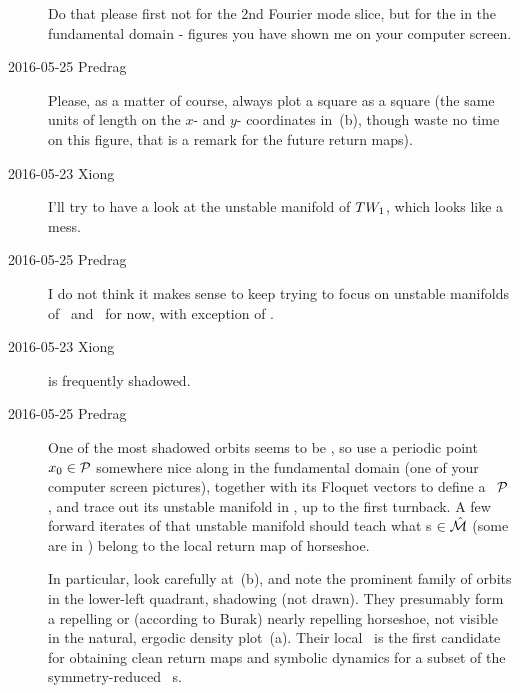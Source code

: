 \begin{description}
Do that please first not for the 2nd Fourier mode slice, but for the
{\fFslice} in the  fundamental domain {\PoincSec} - figures you
have shown me on your computer screen.

\item[2016-05-25 Predrag]
Please, as a matter of course, always plot a square as a square (the same
units of length on the $x$- and $y$- coordinates in
\,(b), though waste no time on this figure, that
is a remark for the future return maps).

\item[2016-05-23 Xiong]
  I'll try to have a look at the unstable manifold of $TW_{1}$, which
  looks like a mess.

\item[2016-05-25 Predrag]
I do not think it makes sense to keep trying to focus on unstable
manifolds of \eqva\ and \reqva\ for now, with exception of .

\item[2016-05-23 Xiong]
   is frequently shadowed.

\item[2016-05-25 Predrag]
One of the most shadowed orbits seems to
be , so use a periodic point $x_0 \in {\ensuremath{\mathcal{P}}}$ somewhere nice
along  in the fundamental domain (one of your computer screen
pictures), together with its Floquet vectors to define a \PoincSec\
${\mathcal{P}}$, and trace out its unstable manifold in {\PoincS}, up to the
first turnback. A few forward iterates of that unstable manifold should
teach what \po s $ \in \hat{\cal M}$ (some are in \reftab{tab:ksShadow}) belong
to the local return map of \RPO{1} horseshoe.

In particular, look carefully at \,(b), and note the
prominent family of orbits in the lower-left quadrant, shadowing \RPO{1}
(not drawn). They presumably form a repelling or (according to Burak)
nearly repelling horseshoe, not visible in the natural, ergodic density
plot \reffig{fig:ksPoinc}\,(a). Their local \PoincSec\ is the first
candidate for obtaining clean return maps and symbolic dynamics for a
subset of the symmetry-reduced \statesp\ \po s.


\end{description}
